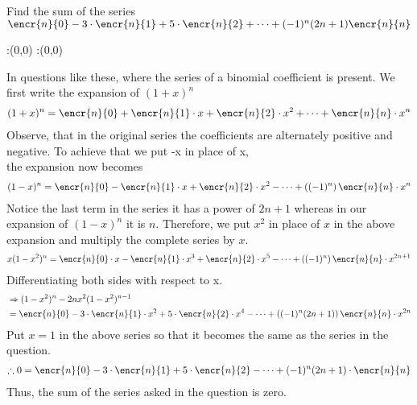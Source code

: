 \question Find the sum of the series \\ $\encr{n}{0} - 3\cdot \encr{n}{1} +5\cdot \encr{n}{2} + \cdots + (-1)^{n}(2n+1)\encr{n}{n}$

\insertQR{}


\ifprintanswers
  \begin{marginfigure}
      :(0,0)
      :(0,0)
    \figdrawbegin{}
      \figdrawline [100,101]
    \figdrawend
    \figvisu{\figBoxA}{}{%
    }
    \centerline{\box\figBoxA}
  \end{marginfigure}
\fi 

\begin{solution}
In questions like these, where the series of a binomial coefficient is present. We first write the expansion of $(1+x)^n$  \\
\begin{align}
(1+x)^n = \encr{n}{0} + \encr{n}{1} \cdot x  + \encr{n}{2} \cdot x^2 + \cdots + \encr{n}{n} \cdot x^n  
\end{align} 
Observe, that in the original series the coefficients are alternately positive and negative. To achieve that we put -x in place of x,\\
the expansion now becomes
\begin{align}
(1-x)^n = \encr{n}{0} - \encr{n}{1}\cdot x + \encr{n}{2}\cdot x^2 - \cdots + \left((-1)^{n}\right) \encr{n}{n}\cdot  x^{n}
\end{align}  
Notice the last term in the series it has a power of $2n+1$ whereas in our expansion of $(1-x)^{n}$ it is $n$. Therefore, we put $x^2$ in place of $x$ in the above expansion and multiply the complete series by $x$.
\begin{align}
x(1-x^2)^n =   \encr{n}{0}\cdot x - \encr{n}{1}\cdot x^3  + \encr{n}{2} \cdot x^{5} - \cdots + \left((-1)^{n}\right) \encr{n}{n} \cdot x^{2n+1} 
\end{align}  
Differentiating both sides with respect to x.
\begin{align}
&\Rightarrow (1-x^2)^n-2nx^2(1-x^2)^{n-1} \nonumber \\
&= \encr{n}{0} - 3\cdot \encr{n}{1}\cdot  x^2  + 5\cdot \encr{n}{2}\cdot x^4  - \cdots +  \left((-1)^{n} (2n+1)\right) \encr{n}{n} \cdot  x^{2n} 
\end{align}  
Put $x =1$ in the above series so that it becomes the same as the series in the question.
\begin{align}
\therefore 0 = \encr{n}{0} - 3\cdot \encr{n}{1} + 5\cdot \encr{n}{2} - \cdots + (-1)^{n} (2n+1) \cdot \encr{n}{n} 
\end{align} 
Thus, the sum of the series asked in the question is zero.
\end{solution}


